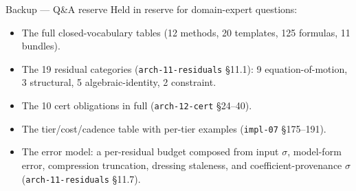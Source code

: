\documentclass[aspectratio=169,10pt]{beamer}
\newcommand{\code}[1]{\texttt{#1}}
\newcommand{\cz}[1]{({\scriptsize\color{gray}#1})}     %
\begin{document}
\appendix

\begin{frame}{Backup --- Q\&A reserve}
  Held in reserve for domain-expert questions:
  \begin{itemize}\small
    \item The full closed-vocabulary tables (12 methods, 20 templates, 125 formulas, 11 bundles).
    \item The 19 residual categories \cz{\code{arch-11-residuals} \S11.1}: 9 equation-of-motion,
      3 structural, 5 algebraic-identity, 2 constraint.
    \item The 10 cert obligations in full \cz{\code{arch-12-cert} \S24--40}.
    \item The tier/cost/cadence table with per-tier examples \cz{\code{impl-07} \S175--191}.
    \item The error model: a per-residual budget composed from input $\sigma$, model-form error,
      compression truncation, dressing staleness, and coefficient-provenance $\sigma$
      \cz{\code{arch-11-residuals} \S11.7}.
  \end{itemize}
\end{frame}
\end{document}
